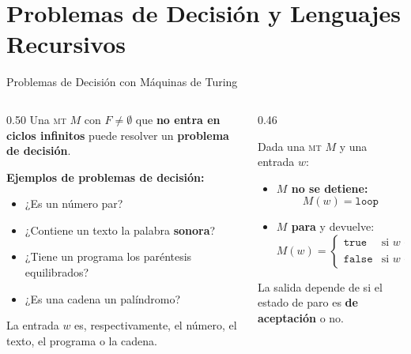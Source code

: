 \documentclass[aspectratio=1610, 12pt]{beamer}
\newcommand{\MT}{\textsc{mt}}
\begin{document}
\section{Problemas de Decisión y Lenguajes Recursivos}
\begin{frame}[t]{Problemas de Decisión con Máquinas de Turing}
\vspace{4pt}
\begin{columns}[T]

  \begin{column}{0.50\textwidth}
    Una \MT{} $M$ con $F \neq \emptyset$ que \textbf{no entra en ciclos infinitos}
    puede resolver un \textcolor{MedBlue}{\textbf{problema de decisión}}.

    \vspace{6pt}
    \textbf{Ejemplos de problemas de decisión:}
    \begin{itemize}\setlength{\itemsep}{4pt}
      \item ¿Es un número par?
      \item ¿Contiene un texto la palabra \textbf{sonora}?
      \item ¿Tiene un programa los paréntesis equilibrados?
      \item ¿Es una cadena un palíndromo?
    \end{itemize}

    \vspace{5pt}
    {\small\color{SlateGray}
      La entrada $w$ es, respectivamente, el número, el texto,
      el programa o la cadena.}
  \end{column}

  \begin{column}{0.46\textwidth}
    \begin{defbox}
      \footnotesize
      Dada una \MT{} $M$ y una entrada $w$:
      \vspace{4pt}
      \begin{itemize}\setlength{\itemsep}{4pt}
        \item[\textcolor{DarkRed}{$\bullet$}]
          \textbf{$M$ no se detiene:}
          \[ M(w) = \mathtt{loop} \]
        \item[\textcolor{MedBlue}{$\bullet$}]
          \textbf{$M$ para} y devuelve:
          \[
            M(w) =
            \begin{cases}
              \mathtt{true}  & \text{si } w \in L(M),\\[2pt]
              \mathtt{false} & \text{si } w \notin L(M).
            \end{cases}
          \]
      \end{itemize}
      \vspace{2pt}
      La salida depende de si el estado de paro
      es \textbf{de aceptación} o no.
    \end{defbox}
  \end{column}

\end{columns}
\end{frame}
\end{document}
